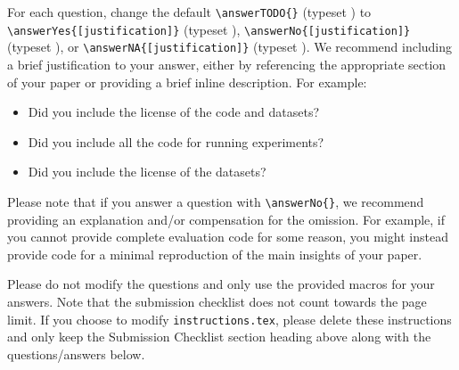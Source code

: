 \documentclass[11pt]{article}
\begin{document}
For each question, change the default \verb|\answerTODO{}| (typeset \answerTODO)
to
\verb|\answerYes{[justification]}| (typeset \answerYes),
\verb|\answerNo{[justification]}| (typeset \answerNo), or
\verb|\answerNA{[justification]}| (typeset \answerNA).
We recommend including a brief justification to your answer, either by
referencing the appropriate section of your paper or providing a brief inline description.  For example:
\begin{itemize}
\item Did you include the license of the code and datasets? 
\item Did you include all the code for running experiments? 
\item Did you include the license of the datasets? 
\end{itemize}
Please note that if you answer a question with \verb|\answerNo{}|, we recommend providing an explanation and/or compensation for the omission. For example, if you cannot provide complete evaluation code for some reason, you might instead provide code for a minimal reproduction of the main insights of your paper.

Please do not modify the questions and only use the provided macros for your
answers. Note that the submission checklist does not count towards the page
limit. If you choose to modify \texttt{instructions.tex}, please delete these
instructions and only keep the Submission Checklist section heading above along
with the questions/answers below.
\end{document}
